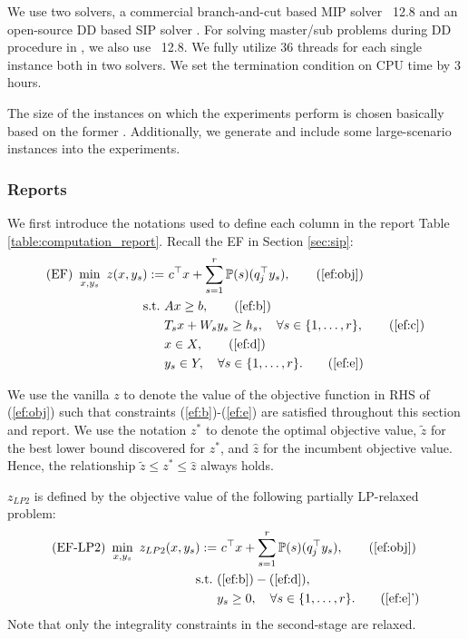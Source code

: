 We use two solvers, a commercial branch-and-cut based MIP solver \cplex\ 12.8 and an open-source DD based SIP solver \dsp. For solving master/sub problems during DD procedure in \dsp, we also use \cplex\ 12.8. We fully utilize 36 threads for each single instance both in two solvers. We set the termination condition on CPU time by 3 hours.  

The size of the instances on which the experiments perform is chosen basically based on the former \siplib. Additionally, we generate and include some large-scenario instances into the experiments.

\subsubsection{Reports}
We first introduce the notations used to define each column in the report Table \ref{table:computation_report}. Recall the EF in Section \ref{sec:sip}:
\begin{subequations}\label{ef}
	\begin{align}
	\textrm{(EF) }\min_{x,y_s}\ z(x,y_s):=&\ c^{\top}x + \sum_{s=1}^{r}\PP(s) (q_j^{\top}y_s), \tag{\ref{ef:obj}}\\ 
	\mathrm{s.t.}\ &Ax\ge b,  \tag{\ref{ef:b}}\\
	&T_s x+W_s y_s\ge h_s,\quad\forall s\in\{1,\ldots,r\}, \tag{\ref{ef:c}} \\
	&x\in X, \tag{\ref{ef:d}} \\
	&y_s \in Y,\quad\forall s\in\{1,\ldots,r\}. \tag{\ref{ef:e}}
	\end{align}
\end{subequations}

We use the vanilla $z$ to denote the value of the objective function in RHS of (\ref{ef:obj}) such that constraints (\ref{ef:b})-(\ref{ef:e}) are satisfied throughout this section and report. We use the notation $z^*$ to denote the optimal objective value, $\tilde{z}$ for the best lower bound discovered for $z^*$, and $\hat{z}$ for the incumbent objective value. Hence, the relationship $\tilde{z}\le z^*\le\hat{z}$ always holds.

$z_{LP2}$ is defined by the objective value of the following partially LP-relaxed problem:
\begin{subequations}\label{ef-lp2}
	\begin{align}
	\textrm{(EF-LP2) }\min_{x,y_s}\ z_{LP2}(x,y_s):=&\ c^{\top}x + \sum_{s=1}^{r}\PP(s) (q_j^{\top}y_s), \tag{\ref{ef:obj}}\\ 
	\mathrm{s.t.}\ &(\ref{ef:b})-(\ref{ef:d}), \nonumber \\
	&y_s \ge 0,\quad\forall s\in\{1,\ldots,r\}. \tag{\ref{ef:e}'}
	\end{align}
\end{subequations}
Note that only the integrality constraints in the second-stage are relaxed.

